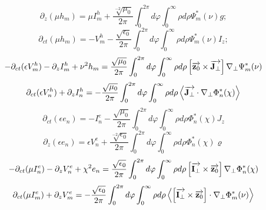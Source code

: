 \begin{equation}
\partial_z (\mu h_m) = \mu I_m^h + \frac{\sqrt[-2]{\mu_0}}{2 \pi}
\int_0^{2\pi} d \varphi \int_0^{\infty} \rho d \rho
\Psi_m^* (\nu) g;
\end{equation}
%
\begin{equation}
\partial_{ct} (\mu h_m) = - V_m^h - \frac{\sqrt{\epsilon_0}}{2 \pi}
\int_0^{2\pi} d \varphi \int_0^{\infty} \rho d \rho
\Psi_m^* (\nu) I_z;
\end{equation}
%
\begin{equation}
- \partial_{ct} (\epsilon V_m^h) - \partial_z I_m^h + \nu^2 h_m = 
\frac{\sqrt{\mu_0}}{2 \pi} \int_0^{2\pi} d \varphi 
\int_0^{\infty} \rho d \rho \left[ \overrightarrow{\mathbf z_0} \times \overrightarrow{\mathbf J_\perp} \right]
\nabla_\perp \Psi_m^* (\nu)
\end{equation}
%
\textcolor{lightgray} { \begin{equation*}
\partial_{ct} (\epsilon V_n^h) + \partial_z I_n^h = 
- \frac{\sqrt{\mu_0}}{2 \pi} \int_0^{2\pi} d \varphi 
\int_0^{\infty} \rho d \rho 
\left< \overrightarrow{\mathbf J_\perp} \cdot \nabla_\perp \Phi_n^* (\chi) \right>
\end{equation*} }
%
\begin{equation}
\partial_{ct} (\epsilon e_n) = - I_n^e - 
\frac{\sqrt{\mu_0}}{2 \pi} \int_0^{2\pi} d \varphi 
\int_0^{\infty} \rho d \rho \Phi_n^* (\chi) J_z
\end{equation}
%
\begin{equation}
\partial_{z} (\epsilon e_n) = \epsilon V_n^e + 
\frac{\sqrt[-2]{\epsilon_0}}{2 \pi} \int_0^{2\pi} d \varphi 
\int_0^{\infty} \rho d \rho \Phi_n^* (\chi) \varrho
\end{equation}
%
\begin{equation}
- \partial_{ct}(\mu I_n^e) - \partial_z V_n^e + \chi^2 e_n = 
\frac{\sqrt{\epsilon_0}}{2 \pi} \int_0^{2\pi} d \varphi 
\int_0^{\infty} \rho d \rho \left[ \overrightarrow{\mathbf I_\perp} \times \overrightarrow{\mathbf z_0} \right]
\nabla_\perp \Phi_n^* (\chi)
\end{equation}
%
\textcolor{lightgray} { \begin{equation*}
\partial_{ct}(\mu I_m^e) + \partial_z V_m^e = - 
\frac{\sqrt{\epsilon_0}}{2 \pi} \int_0^{2\pi} d \varphi 
\int_0^{\infty} \rho d \rho 
\left< \left[ \overrightarrow{\mathbf I_\perp} \times \overrightarrow{\mathbf z_0} \right]  \cdot  \nabla_\perp \Phi_m^* (\nu)  \right>
\end{equation*} }


